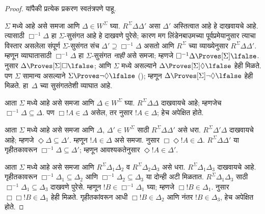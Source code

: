 \documentclass[../../../include/open-logic-section]{subfiles}
\begin{document}
\begin{proof}
  यांपैकी प्रत्येक प्रकरण स्वतंत्रपणे पाहू.

  $\Sigma$ मध्ये  आहे असे समजा आणि
  $\Delta \in W^\Sigma$ घ्या.
  $R^\Sigma \Delta\Delta'$ असा
  $\Delta'$ अस्तित्वात आहे हे दाखवायचे आहे.
  त्यासाठी $\Box^{-1}\Delta$ हा
  $\Sigma$-सुसंगत आहे हे दाखवणे पुरेसे;
  कारण मग लिंडेनबाउमच्या पूर्वप्रमेयानुसार
  त्याचा विस्तार असलेला संपूर्ण
  $\Sigma$-सुसंगत संच
  $\Delta' \supseteq \Box^{-1}\Delta$
  असतो आणि $R^\Sigma$ च्या व्याख्येनुसार
  $R^\Sigma \Delta\Delta'$.
  म्हणून व्याघातासाठी $\Box^{-1}\Delta$
  हा $\Sigma$-सुसंगत \emph{नाही}
  असे समजा; म्हणजे
  $\Box^{-1}\Delta \Proves[\Sigma] \lfalse$.
   नुसार
  $\Delta \Proves[\Sigma] \Box\lfalse$;
  आणि $\Sigma$ मध्ये  असल्याने
  $\Delta \Proves[\Sigma] \Diamond\lfalse$
  हेही मिळते. पण $\Sigma$ सामान्य असल्याने
  $\Sigma \Proves \lnot\Diamond \lfalse$
  ();
  म्हणून $\Delta
  \Proves[\Sigma] \lnot\Diamond \lfalse$
  हेही मिळते. हा~$\Delta$ च्या
  सुसंगततेशी व्याघात आहे.

  आता $\Sigma$ मध्ये  आहे
  असे समजा आणि $\Delta \in W^\Sigma$
  घ्या. $R^\Sigma \Delta\Delta$
  दाखवायचे आहे; म्हणजेच
  $\Box^{-1}\Delta \subseteq \Delta$.
  पण $\Box!A \in \Delta$ असेल,
  तर  नुसार $!A \in \Delta$;
  हेच अपेक्षित होते.

  आता $\Sigma$ मध्ये  आहे
  असे समजा आणि $\Delta$, $\Delta' \in
  W^\Sigma$ साठी $R^\Sigma
  \Delta\Delta'$ असे धरा.
  $R^\Sigma \Delta'\Delta$
  दाखवायचे आहे; म्हणजे
  $\Diamond\Delta \subseteq \Delta'$.
  म्हणून $!A \in \Delta$ असे
  समजा.  नुसार
  $\Box\Diamond!A \in \Delta$.
  $R^\Sigma \Delta\Delta'$ या
  गृहीतकावरून 
  $\Box^{-1}\Delta \subseteq \Delta'$;
  म्हणून आवश्यकतेनुसार
  $\Diamond!A \in \Delta'$.

  आता $\Sigma$ मध्ये  आहे असे
  समजा आणि $R^\Sigma \Delta_1\Delta_2$
  व $R^\Sigma \Delta_2\Delta_3$
  असे धरा. $R^\Sigma
  \Delta_1\Delta_3$ दाखवायचे आहे.
  गृहीतकावरून 
  $\Box^{-1}\Delta_1 \subseteq \Delta_2$
  आणि $\Box^{-1}\Delta_2 \subseteq \Delta_3$
  या दोन्ही अटी मिळतात.
  $R^\Sigma \Delta_1\Delta_3$
  साठी $\Box^{-1}\Delta_1
  \subseteq \Delta_3$ दाखवणे पुरेसे.
  म्हणून $!B \in \Box^{-1}\Delta_1$
  घ्या; म्हणजे $\Box!B \in \Delta_1$.
   नुसार $\Box\Box!B \in
  \Delta_1$ हेही मिळते. गृहीतकांवरून
  आधी $\Box!B \in \Delta_2$
  आणि नंतर $!B \in \Delta_3$,
  हेच अपेक्षित होते.


\end{proof}
\end{document}
